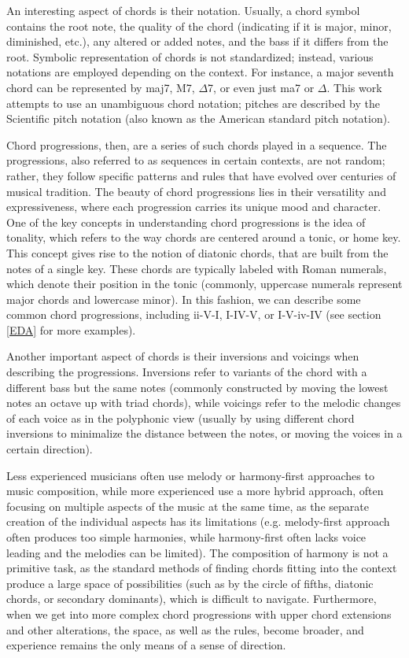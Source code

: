 \documentclass{article}
\begin{document}
An interesting aspect of chords is their notation. Usually, a chord symbol contains the root note, the quality of the chord (indicating if it is major, minor, diminished, etc.), any altered or added notes, and the bass if it differs from the root. Symbolic representation of chords is not standardized; instead, various notations are employed depending on the context. For instance, a major seventh chord can be represented by maj7, M7, $\Delta$7, or even just ma7 or $\Delta$. This work attempts to use an unambiguous chord notation; pitches are described by the Scientific pitch notation (also known as the American standard pitch notation).

Chord progressions, then, are a series of such chords played in a sequence. The progressions, also referred to as sequences in certain contexts, are not random; rather, they follow specific patterns and rules that have evolved over centuries of musical tradition. The beauty of chord progressions lies in their versatility and expressiveness, where each progression carries its unique mood and character. One of the key concepts in understanding chord progressions is the idea of tonality, which refers to the way chords are centered around a tonic, or home key. This concept gives rise to the notion of diatonic chords, that are built from the notes of a single key. These chords are typically labeled with Roman numerals, which denote their position in the tonic (commonly, uppercase numerals represent major chords and lowercase minor). In this fashion, we can describe some common chord progressions, including ii-V-I, I-IV-V, or I-V-iv-IV  (see section \ref{EDA} for more examples).

Another important aspect of chords is their inversions and voicings when describing the progressions. Inversions refer to variants of the chord with a different bass but the same notes (commonly constructed by moving the lowest notes an octave up with triad chords), while voicings refer to the melodic changes of each voice as in the polyphonic view (usually by using different chord inversions to minimalize the distance between the notes, or moving the voices in a certain direction).

Less experienced musicians often use melody or harmony-first approaches to music composition, while more experienced use a more hybrid approach, often focusing on multiple aspects of the music at the same time, as the separate creation of the individual aspects has its limitations (e.g. melody-first approach often produces too simple harmonies, while harmony-first often lacks voice leading and the melodies can be limited). The composition of harmony is not a primitive task, as the standard methods of finding chords fitting into the context produce a large space of possibilities (such as by the circle of fifths, diatonic chords, or secondary dominants), which is difficult to navigate. Furthermore, when we get into more complex chord progressions with upper chord extensions and other alterations, the space, as well as the rules, become broader, and experience remains the only means of a sense of direction.
\end{document}
